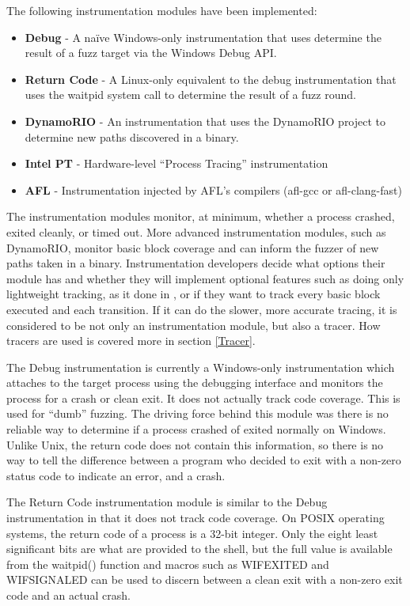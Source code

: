 The following instrumentation modules have been implemented:
\begin{itemize}[noitemsep]
\item \textbf{Debug} - A na\"ive Windows-only instrumentation that uses determine the
	result of a fuzz target via the Windows Debug API.
\item \textbf{Return Code} - A Linux-only equivalent to the debug instrumentation that
	uses the waitpid system call to determine the result of a fuzz round.
\item \textbf{DynamoRIO} - An instrumentation that uses the DynamoRIO project to
	determine new paths discovered in a binary.
\item \textbf{Intel PT} - Hardware-level ``Process Tracing'' instrumentation
\item \textbf{AFL} - Instrumentation injected by AFL's compilers (afl-gcc or
	afl-clang-fast)
\end{itemize}

The instrumentation modules monitor, at minimum, whether a process crashed,
exited cleanly, or timed out. More advanced instrumentation modules, such as
DynamoRIO, monitor basic block coverage and can inform the fuzzer of new paths
taken in a binary.  Instrumentation developers decide what options their
module has and whether they will implement optional features such as doing
only lightweight tracking, as it done in \AFL{}, or if they want to track every
basic block executed and each transition.  If it can do the slower, more
accurate tracing, it is considered to be not only an instrumentation module,
but also a tracer.  How tracers are used is covered more in section
\ref{Tracer}.

The Debug instrumentation is currently a Windows-only instrumentation which
attaches to the target process using the debugging interface and monitors the
process for a crash or clean exit.  It does not actually track code coverage.
This is used for ``dumb'' fuzzing.  The driving force behind this module was
there is no reliable way to determine if a process crashed of exited normally
on Windows.  Unlike Unix, the return code does not contain this information,
so there is no way to tell the difference between a program who decided to
exit with a non-zero status code to indicate an error, and a crash.

The Return Code instrumentation module is similar to the Debug instrumentation
in that it does not track code coverage. On POSIX operating systems, the return
code of a process is a 32-bit integer.  Only the eight least significant bits
are what are provided to the shell, but the full value is available from the
waitpid() function and macros such as WIFEXITED and WIFSIGNALED can be used to
discern between a clean exit with a non-zero exit code and an actual crash.

